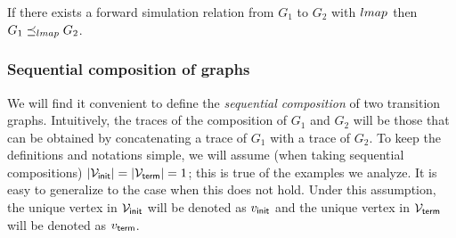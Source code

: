 \begin{proposition}
	\label{prop:graphsim}
	If there exists a forward simulation relation from $G_1$ to
        $G_2$ with ${\sc lmap}$ then $G_1 \preceq_{{\sc lmap}} G_2$.
\end{proposition}

\vspace{-10pt}
\subsubsection{Sequential composition of graphs}

We will find it convenient to define the \emph{sequential composition}
of two transition graphs. Intuitively, the traces of the composition
of $G_1$ and $G_2$ will be those that can be obtained by concatenating
a trace of $G_1$ with a trace of $G_2$. To keep the definitions and
notations simple, we will assume (when taking sequential compositions)
$|{\mathcal V}_{\sf init}| = |{\mathcal V}_{\sf term}| = 1$; this is true of the examples
we analyze. It is easy to generalize to the case when this does not
hold. Under this assumption, the unique vertex in ${\mathcal V}_{\sf init}$ will
be denoted as $v_{\sf init}$ and the unique vertex in ${\mathcal V}_{\sf term}$
will be denoted as $v_{\sf term}$.

